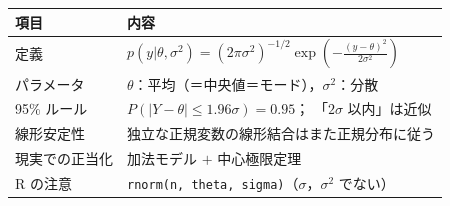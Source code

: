 \documentclass[lualatex,ja=standard,a4paper,12pt]{bxjsarticle}
\begin{document}
\begin{center}
\begin{tabular}{lp{9cm}}
\toprule
\textbf{項目} & \textbf{内容} \\
\midrule
定義 &
  $p(y|\theta,\sigma^2) = (2\pi\sigma^2)^{-1/2}
   \exp\!\left(-\frac{(y-\theta)^2}{2\sigma^2}\right)$ \\[4pt]
パラメータ &
  $\theta$：平均（＝中央値＝モード），\quad $\sigma^2$：分散 \\[4pt]
95\% ルール &
  $P(|Y-\theta| \leq 1.96\sigma) = 0.95$；
  「$2\sigma$ 以内」は近似 \\[4pt]
線形安定性 &
  独立な正規変数の線形結合はまた正規分布に従う \\[4pt]
現実での正当化 &
  加法モデル $+$ 中心極限定理 \\[4pt]
R の注意 &
  \texttt{rnorm(n, theta, sigma)}（$\sigma$，$\sigma^2$ でない） \\
\bottomrule
\end{tabular}
\end{center}
\end{document}
